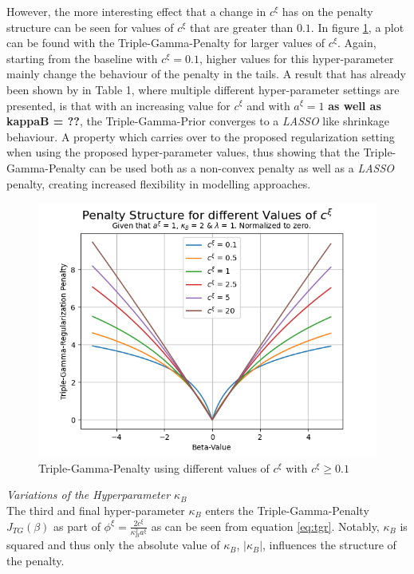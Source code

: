 \documentclass[12pt,a4paper]{article}
\begin{document}
However, the more interesting effect that a change in $c^\xi$ has on the penalty structure can be seen for values of $c^\xi$ that are greater than $0.1$. In figure \ref{fig:ChangeInC_LargeValues}, a plot can be found with the Triple-Gamma-Penalty for larger values of $c^\xi$. Again, starting from the baseline with $c^\xi = 0.1$, higher values for this hyper-parameter mainly change the behaviour of the penalty in the tails. A result that has already been shown by \textcite{TGP2020} in Table 1, where multiple different hyper-parameter settings are presented, is that with an increasing value for $c^\xi$ and with $a^\xi = 1$ \textbf{as well as kappaB = ??}, the Triple-Gamma-Prior converges to a \textit{LASSO} like shrinkage behaviour. A property which carries over to the proposed regularization setting when using the proposed hyper-parameter values, thus showing that the Triple-Gamma-Penalty can be used both as a non-convex penalty as well as a \textit{LASSO} penalty, creating increased flexibility in modelling approaches. 

\begin{figure}[!h]
\centering
\includegraphics[scale=0.75]{../02_simulation/021_simulation_figures/TGPenalty_ChangeInC_Part1.png}
\caption{Triple-Gamma-Penalty using different values of $c^\xi$ with $c^\xi \geq 0.1$}
\label{fig:ChangeInC_LargeValues}
\end{figure}

\textit{Variations of the Hyperparameter $\kappa_B$}\\

The third and final hyper-parameter $\kappa_B$ enters the Triple-Gamma-Penalty $J_{TG}(\beta)$ as part of $\phi^\xi = \frac{2c^\xi}{\kappa_B^2 a^\xi}$ as can be seen from equation \ref{eq:tgr}. Notably, $\kappa_B$ is squared and thus only the absolute value of $\kappa_B$, $|\kappa_B|$, influences the structure of the penalty. 
\end{document}
